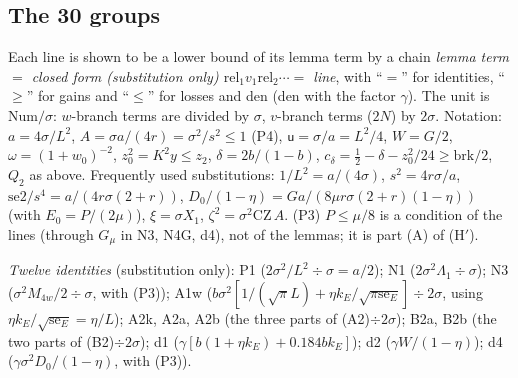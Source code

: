 \subsection{The 30 groups}

Each line is shown to be a lower bound of its lemma term by a chain
\emph{lemma term $=$ closed form (substitution only) $\mathrel{\mathrm{rel}_1}v_1\mathrel{\mathrm{rel}_2}\cdots=$ line},
with ``$=$'' for identities, ``$\ge$'' for gains and ``$\le$'' for losses and den (den with the factor $\gamma$).
The unit is Num$/\sigma$: $w$-branch terms are divided by $\sigma$, $v$-branch terms ($2N$) by $2\sigma$.
Notation: $a=4\sigma/L^2$, $A=\sigma a/(4r)=\sigma^2/s^2\le1$ (P4), $\mathsf u=\sigma/a=L^2/4$, $W=G/2$, $\omega=(1+w_0)^{-2}$, $z_0^2=K^2y\le z_2$, $\delta=2b/(1-b)$, $c_\delta=\frac12-\delta-z_0^2/24\ge\mathrm{brk}/2$, $Q_2$ as above.
Frequently used substitutions: $1/L^2=a/(4\sigma)$, $s^2=4r\sigma/a$, $\mathrm{se2}/s^4=a/(4r\sigma(2+r))$, $D_0/(1-\eta)=Ga/(8\mu r\sigma(2+r)(1-\eta))$ (with $E_0=P/(2\mu)$), $\xi=\sigma X_1$, $\zeta^2=\sigma^2\mathrm{CZ}\,A$.
(P3) $P\le\mu/8$ is a condition of the lines (through $G_\mu$ in N3, N4G, d4), not of the lemmas; it is part (A) of (H$'$).

\emph{Twelve identities} \proofst{} (substitution only):
P1 ($2\sigma^2/L^2\div\sigma=a/2$);
N1 ($2\sigma^2\Lambda_1\div\sigma$);
N3 ($\sigma^2M_{4w}/2\div\sigma$, with (P3));
A1w ($b\sigma^2[1/(\sqrt\pi L)+\eta k_E/\sqrt{\pi\mathrm{se}_E}]\div2\sigma$, using $\eta k_E/\sqrt{\mathrm{se}_E}=\eta/L$);
A2k, A2a, A2b (the three parts of (A2)$\div2\sigma$);
B2a, B2b (the two parts of (B2)$\div2\sigma$);
d1 ($\gamma[b(1+\eta k_E)+0.184bk_E]$);
d2 ($\gamma W/(1-\eta)$);
d4 ($\gamma\sigma^2D_0/(1-\eta)$, with (P3)).

